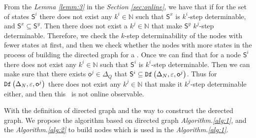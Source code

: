 From the {\em Lemma \ref{lemm:3}} in the {\em Section \ref{sec:online}}, we have that if for the set of states $\mathsf{S}^i$ there does not exist any $k^{i}\in \mathbb{N}$ such that $\mathsf{S}^{x}$ is $k^{i}$-step determinable, and $\mathsf{S}^{x}\subseteq \mathsf{S}^{y}$. Then there does not exist a $k^{j}\in \mathbb{N}$ that make $\mathsf{S}^{y}$ $k^{j}$-step determinable. Therefore, we check the $k$-step determinability of the nodes with fewer states at first, and then we check whether the nodes with more states in the process of building the directed graph for a \BCN. Once we can find that for a node $\mathsf{S}^i$ there does not exist any $k^{i}\in \mathbb{N}$ such that $\mathsf{S}^{i}$ is $k^{i}$-step determinable. Then we can make sure that there exists $\mathsf{o}^{j}\in \Delta_Q$ that $\mathsf{S}^{i}\subseteq {\tt Df}\left(\Delta_N,\varepsilon, \mathsf{o}^{j}\right)$. Thus for ${\tt Df}\left(\Delta_N,\varepsilon, \mathsf{o}^{j}\right)$ there does not exist any $k^{j}\in \mathbb{N}$ that make it $k^{j}$-step determinable either, and then this \BCN\ is not online observable. %

With the definition of directed graph and the way to construct the derected graph. We propose the algorithm based on directed graph {\em Algorithm.\ref{alg:1}}, and the {\em Algorithm.\ref{alg:2}} to build nodes which is used in the {\em Algorithm.\ref{alg:1}}.

